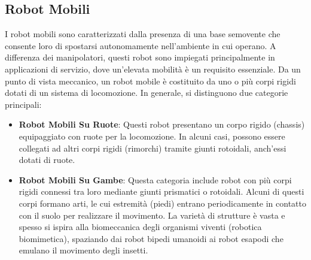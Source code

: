 ﻿\documentclass[11pt, a4paper]{article}
\begin{document}

\newpage
\subsection{Robot Mobili}
I robot mobili sono caratterizzati dalla presenza di una base semovente che consente loro di spostarsi autonomamente nell'ambiente in cui operano. A differenza dei manipolatori, questi robot sono impiegati principalmente in applicazioni di servizio, dove un'elevata mobilità è un requisito essenziale. Da un punto di vista meccanico, un robot mobile è costituito da uno o più corpi rigidi dotati di un sistema di locomozione. In generale, si distinguono due categorie principali:


\begin{itemize}
    \item \textbf{Robot Mobili Su Ruote}: Questi robot presentano un corpo rigido (chassis) equipaggiato con ruote per la locomozione. In alcuni casi, possono essere collegati ad altri corpi rigidi (rimorchi) tramite giunti rotoidali, anch'essi dotati di ruote.
    \item \textbf{Robot Mobili Su Gambe}: Questa categoria include robot con più corpi rigidi connessi tra loro mediante giunti prismatici o rotoidali. Alcuni di questi corpi formano arti, le cui estremità (piedi) entrano periodicamente in contatto con il suolo per realizzare il movimento. La varietà di strutture è vasta e spesso si ispira alla biomeccanica degli organismi viventi (robotica biomimetica), spaziando dai robot bipedi umanoidi ai robot esapodi che emulano il movimento degli insetti.
\end{itemize}
\end{document}
